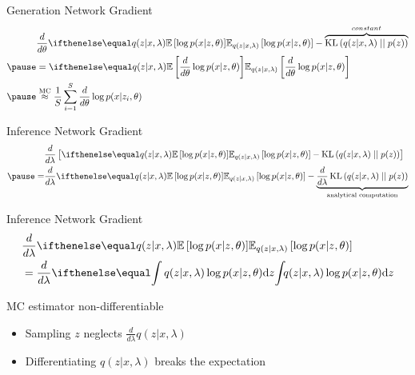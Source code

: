 \documentclass[14pt]{beamer}
\begin{document}
\begin{frame}{Generation Network Gradient}
\begin{equation*}
\begin{aligned}
&\frac{d}{d\theta}\E[q(z|x,\lambda)]{\log p(x|z,\theta)} - \overbrace{\KL{q(z|x,\lambda)}{p(z)}}^{constant} \\ \pause 
&=\E[q(z|x,\lambda)]{\frac{d}{d\theta}\log p(x|z,\theta)} \\ \pause
&\overset{\text{MC}}{\approx} \frac{1}{S}\sum_{i=1}^{S}
\frac{d}{d\theta} \log p(x|z_{i},\theta)
\end{aligned}
\end{equation*}
\pause
{}
\end{frame}

\begin{frame}{Inference Network Gradient}
\begin{equation*}
\begin{aligned}
&\frac{d}{d\lambda}\left[\E[q(z|x,\lambda)]{\log p(x|z,\theta)} - \KL{q(z|x,\lambda)}{p(z)} \right] \\ \pause
=&\frac{d}{d\lambda}\E[q(z|x,\lambda)]{\log p(x|z,\theta)} - \underbrace{\frac{d}{d\lambda}\KL{q(z|x,\lambda)}{p(z)}}_{\text{analytical computation}} \\
\end{aligned}
\end{equation*}
\pause
{}
\end{frame}

\begin{frame}{Inference Network Gradient}
\begin{align*}
&\frac{d}{d\lambda}\E[q(z|x,\lambda)]{\log p(x|z,\theta)} \\
&= \frac{d}{d\lambda} \intl{q(z|x,\lambda)\log p(x|z,\theta)}{z}
\end{align*}
\pause
\begin{block}{MC estimator non-differentiable}
\begin{itemize}
\pause
\item Sampling $ z $ neglects $ \frac{d}{d\lambda} q(z|x,\lambda) $
\pause
\item Differentiating $ q(z|x,\lambda) $ breaks the expectation
\end{itemize}
\end{block}
\end{frame}
\end{document}
